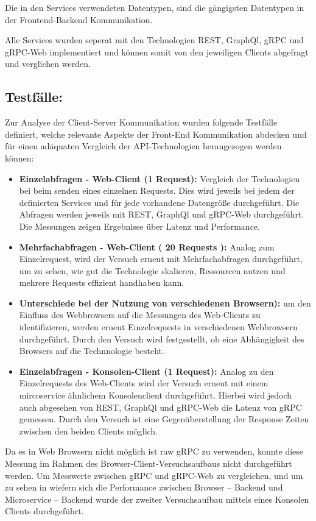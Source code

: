 Die in den Services verwendeten Datentypen, sind die gängigsten Datentypen in der Frontend-Backend Kommunikation.

Alle Services wurden seperat mit den Technologien REST, GraphQl, gRPC und gRPC-Web implementiert und können somit von den jeweiligen Clients abgefragt und verglichen werden.

\subsection*{Testfälle:}
Zur Analyse der Client-Server Kommunikation wurden folgende Testfälle definiert, welche relevante Aspekte der Front-End Kommunikation abdecken und für einen adäquaten Vergleich der API-Technologien herangezogen werden können: 
\begin{itemize}
	\item \textbf{Einzelabfragen - Web-Client (1 Request):} Vergleich der Technologien bei beim senden eines einzelnen Requests. Dies wird jeweils bei jedem der definierten Services und für jede vorhandene Datengröße durchgeführt. Die Abfragen werden jeweils mit REST, GraphQl und gRPC-Web durchgeführt. Die Messungen zeigen Ergebnisse über Latenz und Performance.
	\item \textbf{Mehrfachabfragen - Web-Client ( 20 Requests ):} Analog zum Einzelrequest, wird der Versuch erneut mit Mehrfachabfragen durchgeführt, um zu sehen, wie gut die Technologie skalieren, Ressourcen nutzen und mehrere Requests effizient handhaben kann.  
	\item \textbf{Unterschiede bei der Nutzung von verschiedenen Browsern):} um den Einfluss des Webbrowsers auf die Messungen des Web-Clients zu identifizieren, werden erneut Einzelrequests in verschiedenen Webbrowsern durchgeführt. Durch den Versuch wird festgestellt, ob eine Abhängigkeit des Browsers auf die Technnologie besteht.
	\item \textbf{Einzelabfragen - Konsolen-Client (1 Request):} Analog zu den Einzelrequests des Web-Clients wird der Versuch erneut mit einem mircoservice ähnlichem Konsolenclient durchgeführt. Hierbei wird jedoch auch abgesehen von REST, GraphQl und gRPC-Web die Latenz von gRPC gemessen. Durch den Versuch ist eine Gegenüberstellung der Response Zeiten zwischen den beiden Clients möglich.
\end{itemize}

Da es in Web Browsern nicht möglich ist raw gRPC zu verwenden, konnte diese Messung im Rahmen des Browser-Client-Versuchsaufbaus nicht durchgeführt werden. Um Messwerte zwischen gRPC und gRPC-Web zu vergleichen, und um zu sehen in wiefern sich die Performance zwischen Browser – Backend und Microservice – Backend wurde der zweiter Versuchsaufbau mittels eines Konsolen Clients durchgeführt.

